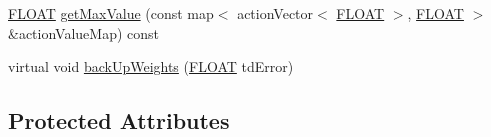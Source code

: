 \begin{DoxyCompactItemize}
\item 
\hyperlink{namespaceAI_a41b74884a20833db653dded3918e05c3}{F\+L\+O\+A\+T} \hyperlink{classAI_1_1Algorithm_1_1GradientDescent_a651b2804acf14aaebdf461d39cd970eb}{get\+Max\+Value} (const map$<$ action\+Vector$<$ \hyperlink{namespaceAI_a41b74884a20833db653dded3918e05c3}{F\+L\+O\+A\+T} $>$, \hyperlink{namespaceAI_a41b74884a20833db653dded3918e05c3}{F\+L\+O\+A\+T} $>$ \&action\+Value\+Map) const 
\item 
virtual void \hyperlink{classAI_1_1Algorithm_1_1GradientDescent_a49b556716f8ca93c088b10f4432a3688}{back\+Up\+Weights} (\hyperlink{namespaceAI_a41b74884a20833db653dded3918e05c3}{F\+L\+O\+A\+T} td\+Error)
\end{DoxyCompactItemize}
\subsection*{Protected Attributes}
